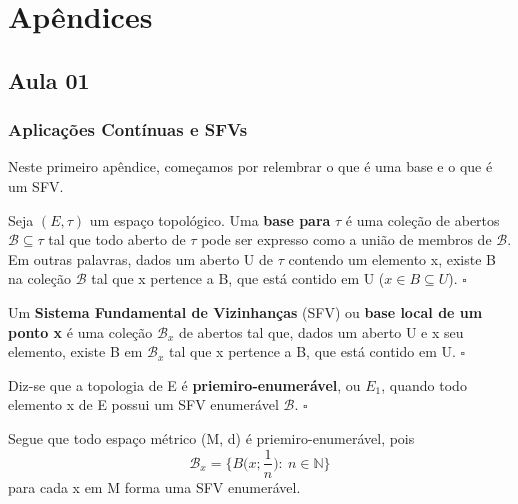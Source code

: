 \documentclass[../distribution_theory_notes.tex]{subfiles}
\begin{document}
\section*{Apêndices}
\subsection*{Aula 01}
\subsubsection*{Aplicações Contínuas e SFVs}
Neste primeiro apêndice, começamos por relembrar o que é uma base e o que é um SFV.

\begin{def*}
	Seja \((E, \tau )\) um espaço topológico. Uma \textbf{base para} \(\tau \) é uma coleção de abertos \(\mathcal{B}\subseteq \tau \) tal que todo aberto de \(\tau \) pode ser expresso como
	a união de membros de \(\mathcal{B}\). Em outras palavras, dados um aberto U de \(\tau \) contendo um elemento x, existe B na coleção \(\mathcal{B}\) tal que x pertence a B, que está contido em U (\(x\in B\subseteq U\)). \(\square\)
\end{def*}

\hypertarget{sistema_fundamental_vizinhas}{\begin{def*}
		Um \textbf{Sistema Fundamental de Vizinhanças} (SFV) ou \textbf{base local de um ponto x} é uma coleção \(\mathcal{B}_{x}\) de abertos tal que, dados um aberto U e x seu elemento, existe B em \(\mathcal{B}_{x}\) tal que x pertence a B, que está contido em U. \(\square\)
	\end{def*}}

\begin{def*}
	Diz-se que a topologia de E é \textbf{priemiro-enumerável}, ou \(E_{1}\), quando todo elemento x de E possui um SFV enumerável \(\mathcal{B}\). \(\square\)
\end{def*}

Segue que todo espaço métrico (M, d) é priemiro-enumerável, pois
\[
	\mathcal{B}_{x}=\biggl\{B \biggl(x; \frac{1}{n}\biggr):\: n\in \mathbb{N}\biggr\}
\]
para cada x em M forma uma SFV enumerável.
\end{document}
